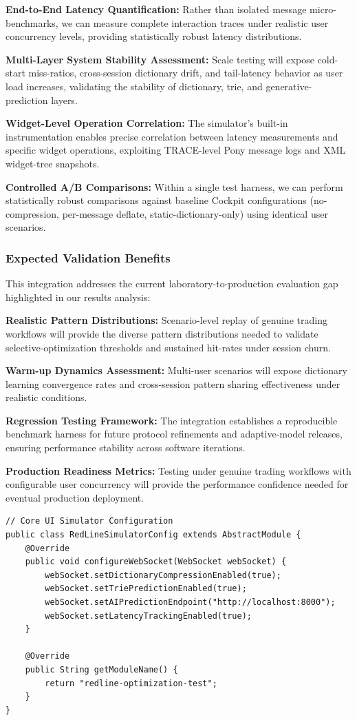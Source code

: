 \documentclass[12pt,a4paper]{article}
\begin{document}
\textbf{End-to-End Latency Quantification:} Rather than isolated message micro-benchmarks, we can measure complete interaction traces under realistic user concurrency levels, providing statistically robust latency distributions.

\textbf{Multi-Layer System Stability Assessment:} Scale testing will expose cold-start miss-ratios, cross-session dictionary drift, and tail-latency behavior as user load increases, validating the stability of dictionary, trie, and generative-prediction layers.

\textbf{Widget-Level Operation Correlation:} The simulator's built-in instrumentation enables precise correlation between latency measurements and specific widget operations, exploiting TRACE-level Pony message logs and XML widget-tree snapshots.

\textbf{Controlled A/B Comparisons:} Within a single test harness, we can perform statistically robust comparisons against baseline Cockpit configurations (no-compression, per-message deflate, static-dictionary-only) using identical user scenarios.

\subsubsection{Expected Validation Benefits}

This integration addresses the current laboratory-to-production evaluation gap highlighted in our results analysis:

\textbf{Realistic Pattern Distributions:} Scenario-level replay of genuine trading workflows will provide the diverse pattern distributions needed to validate selective-optimization thresholds and sustained hit-rates under session churn.

\textbf{Warm-up Dynamics Assessment:} Multi-user scenarios will expose dictionary learning convergence rates and cross-session pattern sharing effectiveness under realistic conditions.

\textbf{Regression Testing Framework:} The integration establishes a reproducible benchmark harness for future protocol refinements and adaptive-model releases, ensuring performance stability across software iterations.

\textbf{Production Readiness Metrics:} Testing under genuine trading workflows with configurable user concurrency will provide the performance confidence needed for eventual production deployment.

\begin{lstlisting}[caption=Integration Architecture Example]
// Core UI Simulator Configuration
public class RedLineSimulatorConfig extends AbstractModule {
    @Override
    public void configureWebSocket(WebSocket webSocket) {
        webSocket.setDictionaryCompressionEnabled(true);
        webSocket.setTriePredictionEnabled(true);
        webSocket.setAIPredictionEndpoint("http://localhost:8000");
        webSocket.setLatencyTrackingEnabled(true);
    }
    
    @Override
    public String getModuleName() {
        return "redline-optimization-test";
    }
}
\end{lstlisting}
\end{document}
